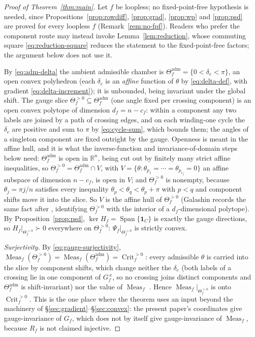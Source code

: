 \documentclass[11pt]{article}
\theoremstyle{definition}
\DeclareMathOperator{\Meas}{Meas}
\DeclareMathOperator{\Crit}{Crit}
\DeclareMathOperator{\Span}{Span}
\newcommand{\R}{\mathbb{R}}
\newcommand{\Thef}{\Theta_f^{>0}}
\newcommand{\Theadm}{\Theta_f^{\mathrm{adm}}}
\newcommand{\Critf}{\Crit_f^{>0}}
\begin{document}
\begin{proof}[Proof of Theorem~\ref{thm:main}]
Let $f$ be loopless; no fixed-point-free hypothesis is needed, since
Propositions~\ref{prop:rowdiff}, \ref{prop:grad}, \ref{prop:wp} and \ref{prop:psd} are proved for every
loopless $f$ (Remark~\ref{rem:no-fpf}). Readers who prefer the component route may instead invoke
Lemma~\ref{lem:reduction}, whose commuting square \eqref{eq:reduction-square} reduces the statement to
the fixed-point-free factors; the argument below does not use it.

By \eqref{eq:adm-delta} the ambient admissible chamber is $\Theadm=\{0<\delta_e<\pi\}$, an open convex
polyhedron (each $\delta_e$ is an \emph{affine} function of $\theta$ by \eqref{eq:delta-def}, with
gradient \eqref{eq:delta-increment}); it is unbounded, being invariant under the global shift. The gauge
slice $\Thef\subseteq\Theadm$ (one angle fixed per crossing component) is an open convex polytope of
dimension $d_f=n-c_f$: within a component any two labels are joined by a path of crossing edges, and on
each winding-one cycle the $\delta_e$ are positive and sum to $\pi$ by \eqref{eq:cycle-sum}, which bounds
them; the angles of a singleton component are fixed outright by the gauge. Openness is meant in the
affine hull, and it is what the inverse-function and invariance-of-domain steps below need: $\Theadm$ is
open in $\R^n$, being cut out by finitely many strict affine inequalities, so
$\Thef=\Theadm\cap V$, with $V=\{\theta:\theta_{p_1}=\cdots=\theta_{p_{c_f}}=0\}$ an affine subspace of
dimension $n-c_f$, is open in $V$; and $\Thef$ is nonempty, because $\theta_j=\pi j/n$ satisfies every
inequality $\theta_p<\theta_q<\theta_p+\pi$ with $p<q$ and component shifts move it into the slice. So
$V$ is the affine hull of $\Thef$ (Galashin records the same fact after \cite[eq.~(4.3)]{Galashin},
identifying $\Thef$ with the interior of a $d_f$-dimensional polytope). By Proposition~\ref{prop:psd},
$\ker H_f=\Span\{\mathbf1_C\}$ is exactly the gauge directions, so $H_f\big|_{\Thef}\succ0$ everywhere on
$\Thef$: $\Psi_f\big|_{\Thef}$ is strictly convex.

\emph{Surjectivity.} By \eqref{eq:gauge-surjectivity}, $\Meas_f(\Thef)=\Meas_f(\Theadm)=\Critf$: every
admissible $\theta$ is carried into the slice by component shifts, which change neither the $\delta_e$
(both labels of a crossing lie in one component of $G_f^{\,x}$, so no crossing joins distinct components
and $\Theadm$ is shift-invariant) nor the value of $\Meas_f$
\cite[Prop.~4.2 and the paragraph following it]{Galashin}. Hence $\Meas_f\big|_{\Thef}$ is onto $\Critf$.
This is the one place where the theorem uses an input beyond the machinery of
\S\ref{sec:gradient}--\S\ref{sec:convex}: the present paper's coordinates give gauge-invariance of $G_f$,
which does not by itself give gauge-invariance of $\Meas_f$, because $R_f$ is not claimed injective.


\end{proof}
\end{document}

